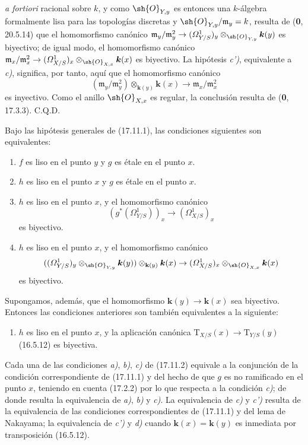 
\emph{a fortiori} racional sobre $k$, y como $\sh{O}_{Y,y}$ es entonces una $k$-álgebra formalmente lisa para las topologías discretas y $\sh{O}_{Y,y}/\mathfrak m_y=k$, resulta de (\textbf 0, 20.5.14) que el homomorfismo canónico $\mathfrak m_y/\mathfrak m_y^2\to(\varOmega^1_{Y/S})_y\otimes_{\sh{O}_{Y,y}}\boldsymbol k(y)$ es biyectivo; de igual modo, el homomorfismo canónico $\mathfrak m_x/\mathfrak m_x^2\to(\varOmega^1_{X/S})_x\otimes_{\sh{O}_{X,x}}\boldsymbol k(x)$ es biyectivo. La hipótesis \emph{c')}, equivalente a \emph{c)}, significa, por tanto, aquí que el homomorfismo canónico
\[
(\mathfrak m_y/\mathfrak m_y^2)\otimes_{\mathbf{k}(y)}\boldsymbol{k}(x)\to\mathfrak m_x/\mathfrak m_x^2
\]
es inyectivo. Como el anillo $\sh{O}_{X,x}$ es regular, la conclusión resulta de (\textbf 0, 17.3.3). C.Q.D.

\begin{corollary}[17.11.2]
\label{IV.17.11.2}
Bajo las hipótesis generales de \textup{(17.11.1)}, las condiciones siguientes son equivalentes:
\begin{enumerate}
  \item[\textup{a)}] $f$ es liso en el punto $y$ y $g$ es étale en el punto $x$.
  \item[\textup{b)}] $h$ es liso en el punto $x$ y $g$ es étale en el punto $x$.
  \item[\textup{c)}] $h$ es liso en el punto $x$, y el homomorfismo canónico
  \[
  (g^*(\varOmega^1_{Y/S}))_x\to(\varOmega^1_{X/S})_x
  \]
  es biyectivo.
  \item[\textup{c$'$)}] $h$ es liso en el punto $x$, y el homomorfismo canónico
  \[
  ((\varOmega^1_{Y/S})_y\otimes_{\sh{O}_{Y,y}}\boldsymbol{k}(y))\otimes_{\mathbf{k}(y)}\boldsymbol{k}(x)\to(\varOmega^1_{X/S})_x\otimes_{\sh{O}_{X,x}}\boldsymbol{k}(x)
  \]
  es biyectivo.
\end{enumerate}
Supongamos, además, que el homomorfismo $\boldsymbol{k}(y)\to\boldsymbol{k}(x)$ sea biyectivo. Entonces las condiciones anteriores son también equivalentes a la siguiente:
\begin{enumerate}
  \item[\textup{d)}] $h$ es liso en el punto $x$, y la aplicación canónica $\mathrm{T}_{X/S}(x)\to\mathrm{T}_{Y/S}(y)$ \textup{(16.5.12)} es biyectiva.
\end{enumerate}
\end{corollary}

Cada una de las condiciones \emph{a)}, \emph{b)}, \emph{c)} de (17.11.2) equivale a la conjunción de la condición correspondiente de (17.11.1) y del hecho de que $g$ es no ramificado en el punto $x$, teniendo en cuenta (17.2.2) por lo que respecta a la condición \emph{c)}; de donde resulta la equivalencia de \emph{a)}, \emph{b)} y \emph{c)}. La equivalencia de \emph{c)} y \emph{c')} resulta de la equivalencia de las condiciones correspondientes de (17.11.1) y del lema de Nakayama; la equivalencia de \emph{c')} y \emph{d)} cuando $\boldsymbol{k}(x)=\boldsymbol{k}(y)$ es inmediata por transposición (16.5.12).

